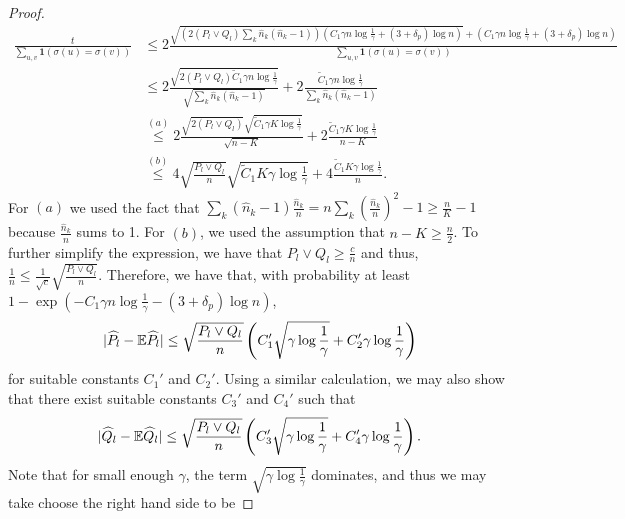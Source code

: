 \documentclass{article}
\begin{document}
\begin{proof}
\begin{align*}
 \frac{t}{\sum_{u,v} \mathbf{1}(\sigma(u) = \sigma(v)) } &\leq
  2 \frac{  \sqrt{  \left( 2 (P_l \vee Q_l) \sum_k \hat{n}_k (\hat{n}_k - 1) \right) 
                 \left(  C_1 \gamma n \log \frac{1}{\gamma} + (3+\delta_p) \log n \right) }  
          + 
               \left(  C_1 \gamma n \log \frac{1}{\gamma} + (3+\delta_p) \log n\right)  }
        { \sum_{u,v} \mathbf{1}(\sigma(u) = \sigma(v) ) }  \\
  &\leq 2 \frac{\sqrt{2 (P_l \vee Q_l) \tilde C_1 \gamma n \log \frac{1}{\gamma}}}
             {\sqrt{ \sum_k \hat{n}_k (\hat{n}_k - 1)}} + 
        2  \frac{\tilde C_1\gamma n \log \frac{1}{\gamma}}
             {\sum_k \hat{n}_k (\hat{n}_k - 1)} \\
 &\stackrel{(a)}\leq  2 \frac{ \sqrt{2 (P_l\vee Q_l)} \sqrt{ \tilde C_1 \gamma K \log \frac{1}{\gamma}} }
           {\sqrt{n - K}} + 
       2 \frac{\tilde C_1 \gamma K \log \frac{1}{\gamma}}{n - K} \\
 &\stackrel{(b)}\leq 4 \sqrt{ \frac{P_l \vee Q_l}{n} } \sqrt{\tilde C_1 K \gamma \log \frac{1}{\gamma}} + 
       4 \frac{\tilde C_1 K \gamma \log \frac{1}{\gamma}}{n}. 
\end{align*}
For $(a)$ we used the fact that $\sum_k (\hat{n}_k - 1) \frac{\hat{n}_k}{n} = n \sum_k \left( \frac{\hat{n}_k}{n} \right)^2 - 1 \geq \frac{n}{K} - 1 $ because $\frac{\hat{n}_k}{n}$ sums to 1. For $(b)$, we used the assumption that $n-K \geq \frac{n}{2}$. To further simplify the expression, we have that $P_l \vee Q_l \geq \frac{c}{n}$ and thus, $\frac{1}{n} \leq \frac{1}{\sqrt c}\sqrt{ \frac{P_l \vee Q_l}{n} }$. Therefore, we have that, with probability at least $1 - \exp( - C_1 \gamma n \log \frac{1}{\gamma} - (3 + \delta_p) \log n)$, 
\begin{align}
| \widehat{P}_l - {\mathbb E} \widehat{P}_l | \leq \sqrt{ \frac{P_l \vee Q_l}{n} } \left( C_1' \sqrt{\gamma \log \frac{1}{\gamma}} + C_2' \gamma \log \frac{1}{\gamma} \right) \label{eqn:variance_bound}
\end{align}
for suitable constants $C_1'$ and $C_2'$. Using a similar calculation, we may also show that there exist suitable constants $C_3'$ and $C_4'$ such that
\begin{align}
| \widehat{Q}_l - {\mathbb E} \widehat{Q}_l | \leq \sqrt{ \frac{P_l \vee Q_l}{n} } \left( C_3' \sqrt{\gamma \log \frac{1}{\gamma}} + C_4' \gamma \log \frac{1}{\gamma} \right).
\end{align}
Note that for small enough $\gamma$, the term $\sqrt{\gamma \log \frac{1}{\gamma}}$ dominates, and thus we may take choose the right hand side to be 

\end{proof}
\end{document}
